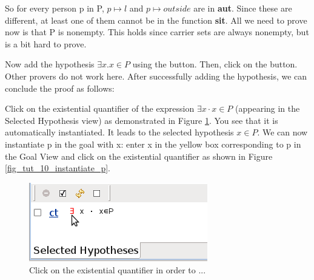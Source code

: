So for every person \textsf{p} in \textsf{P}, $p \mapsto l$ and $p \mapsto outside$ are in \textbf{aut}. Since these are different, at least one of them cannot be in the function \textbf{sit}. All we need to prove now is that \textsf{P} is nonempty. This holds since carrier sets are always nonempty, but is a bit hard to prove. 



Now add the hypothesis $\exists x . x \in P$ using the  button. Then, click on the  button. Other provers do not work here. After successfully adding the hypothesis, we can conclude the proof as follows:

Click on the existential quantifier of the expression $\exists x \cdot x \in P$ (appearing in the \textsf{Selected Hypothesis} view) as demonstrated in Figure \ref{fig_tut_10_instantiate_x}. You see that it is automatically instantiated. It leads to the selected hypothesis $x \in P$. We can now instantiate \textsf{p} in the goal with \textsf{x}: enter \textsf{x} in the yellow box corresponding to \textsf{p} in the \textsf{Goal View} and click on the existential quantifier as shown in Figure \ref{fig_tut_10_instantiate_p}. 

\begin{figure}[!ht]
\begin{center}
	\includegraphics{img/tutorial/tut_10_instantiate_x.png}
	\caption{Click on the existential quantifier in order to ...}
	\label{fig_tut_10_instantiate_x}
\end{center}
\end{figure}

